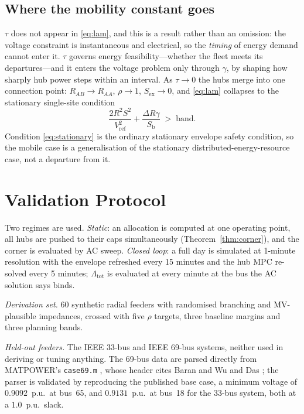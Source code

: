 \documentclass[lettersize,journal]{IEEEtran}
\newcommand{\Lamt}{\Lambda_{\mathrm{tot}}}
\newcommand{\Sb}{S_{\mathrm{b}}}
\begin{document}
\subsection{Where the mobility constant goes}\label{sec:tau}
$\tau$ does not appear in \eqref{eq:lam}, and this is a result rather than an
omission: the voltage constraint is instantaneous and electrical, so the
\emph{timing} of energy demand cannot enter it. $\tau$ governs energy
feasibility---whether the fleet meets its departures---and it enters the
voltage problem only through $\gamma$, by shaping how sharply hub power steps
within an interval. As $\tau\!\to\!0$ the hubs merge into one connection point:
$R_{AB}\!\to\!R_{AA}$, $\rho\!\to\!1$, $S_{\mathrm{ex}}\!\to\!0$, and
\eqref{eq:lam} collapses to the stationary single-site condition
\begin{equation}\label{eq:stationary}
\frac{2R^{2}S^{2}}{V_{\mathrm{ref}}^{2}}+\frac{\Delta R\gamma}{\Sb}\;>\;\mathrm{band}.
\end{equation}
Condition \eqref{eq:stationary} is the ordinary stationary envelope safety
condition, so the mobile case is a generalisation of the stationary
distributed-energy-resource case, not a departure from it.

\section{Validation Protocol}\label{sec:method}
Two regimes are used. \emph{Static}: an allocation is computed at one operating
point, all hubs are pushed to their caps simultaneously
(Theorem~\ref{thm:corner}), and the corner is evaluated by AC sweep.
\emph{Closed loop}: a full day is simulated at 1-minute resolution with the
envelope refreshed every 15 minutes and the hub MPC re-solved every 5 minutes;
$\Lamt$ is evaluated at every minute at the bus the AC solution says binds.

\emph{Derivation set.} 60 synthetic radial feeders with randomised branching
and MV-plausible impedances, crossed with five $\rho$ targets, three baseline
margins and three planning bands.

\emph{Held-out feeders.} The IEEE 33-bus and IEEE 69-bus systems, neither used
in deriving or tuning anything. The 69-bus data are parsed directly from
MATPOWER's \texttt{case69.m} \cite{zimmerman2011matpower}, whose header cites
Baran and Wu \cite{baran1989capacitor} and Das \cite{das2008capacitors}; the
parser is validated by reproducing the published base case, a minimum voltage
of $0.9092$~p.u.\ at bus~65, and $0.9131$~p.u.\ at bus~18 for the 33-bus
system, both at a $1.0$~p.u.\ slack.
\end{document}
